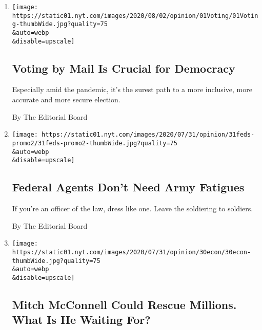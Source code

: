 \begin{enumerate}
\def\labelenumi{\arabic{enumi}.}
\item
  \href{/2020/08/01/opinion/sunday/mail-voting-covid-2020-election.html}{}

  \texttt{[image: https://static01.nyt.com/images/2020/08/02/opinion/01Voting/01Voting-thumbWide.jpg?quality=75\\\&auto=webp\\\&disable=upscale]}

  \hypertarget{voting-by-mail-is-crucial-for-democracy}{%
  \subsection{Voting by Mail Is Crucial for
  Democracy}\label{voting-by-mail-is-crucial-for-democracy}}

  Especially amid the pandemic, it's the surest path to a more
  inclusive, more accurate and more secure election.

  By The Editorial Board
\item
  \href{/2020/07/31/opinion/federal-agents-trump-uniforms.html}{}

  \texttt{[image: https://static01.nyt.com/images/2020/07/31/opinion/31feds-promo2/31feds-promo2-thumbWide.jpg?quality=75\\\&auto=webp\\\&disable=upscale]}

  \hypertarget{federal-agents-dont-need-army-fatigues}{%
  \subsection{Federal Agents Don't Need Army
  Fatigues}\label{federal-agents-dont-need-army-fatigues}}

  If you're an officer of the law, dress like one. Leave the soldiering
  to soldiers.

  By The Editorial Board
\item
  \href{/2020/07/30/opinion/mitch-mcconnell-coronavirus-economy.html}{}

  \texttt{[image: https://static01.nyt.com/images/2020/07/31/opinion/30econ/30econ-thumbWide.jpg?quality=75\\\&auto=webp\\\&disable=upscale]}

  \hypertarget{mitch-mcconnell-could-rescue-millions-what-is-he-waiting-for}{%
  \subsection{Mitch McConnell Could Rescue Millions. What Is He Waiting
  For?}\label{mitch-mcconnell-could-rescue-millions-what-is-he-waiting-for}}


\end{enumerate}
